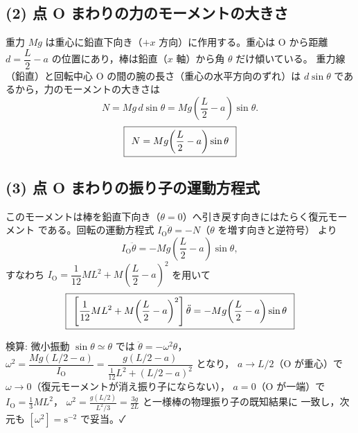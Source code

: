 \documentclass[11pt,a4paper]{article}
\begin{document}
\subsection*{(2) 点 O まわりの力のモーメントの大きさ}
重力 $Mg$ は重心に鉛直下向き（$+x$ 方向）に作用する。重心は O から距離
$d=\dfrac{L}{2}-a$ の位置にあり，棒は鉛直（$x$ 軸）から角 $\theta$ だけ傾いている。
重力線（鉛直）と回転中心 O の間の腕の長さ（重心の水平方向のずれ）は
$d\sin\theta$ であるから，力のモーメントの大きさは
\[
  N=Mg\,d\sin\theta=Mg\!\left(\frac{L}{2}-a\right)\sin\theta .
\]
\[
  \boxed{\,\;N=Mg\!\left(\dfrac{L}{2}-a\right)\sin\theta\;\,}
\]

\subsection*{(3) 点 O まわりの振り子の運動方程式}
このモーメントは棒を鉛直下向き（$\theta=0$）へ引き戻す向きにはたらく復元モーメント
である。回転の運動方程式 $I_{\mathrm O}\ddot{\theta}=-N$（$\theta$ を増す向きと逆符号）
より
\[
  I_{\mathrm O}\ddot{\theta}=-Mg\!\left(\frac{L}{2}-a\right)\sin\theta,
\]
すなわち $I_{\mathrm O}=\dfrac{1}{12}ML^2+M\!\left(\dfrac{L}{2}-a\right)^{2}$ を用いて
\[
  \boxed{\,\;\left[\dfrac{1}{12}ML^2+M\!\left(\dfrac{L}{2}-a\right)^{2}\right]\ddot{\theta}
   =-Mg\!\left(\dfrac{L}{2}-a\right)\sin\theta\;\,}
\]

\medskip
検算: 微小振動 $\sin\theta\simeq\theta$ では
$\ddot{\theta}=-\omega^2\theta$，$\omega^2=\dfrac{Mg(L/2-a)}{I_{\mathrm O}}
=\dfrac{g(L/2-a)}{\frac{1}{12}L^2+(L/2-a)^2}$ となり，
$a\to L/2$（O が重心）で $\omega\to0$（復元モーメントが消え振り子にならない），
$a=0$（O が一端）で $I_{\mathrm O}=\frac13ML^2$，
$\omega^2=\frac{g(L/2)}{L^2/3}=\frac{3g}{2L}$ と一様棒の物理振り子の既知結果に
一致し，次元も $[\omega^2]=\mathrm{s^{-2}}$ で妥当。✓
\end{document}
